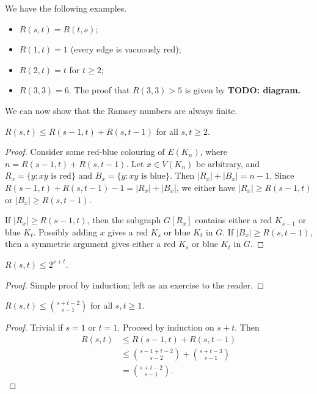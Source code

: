 \documentclass[main.tex]{subfiles}
\begin{document}
We have the following examples.
\begin{example*}
  \listhack
  \begin{itemize}
    \item $R(s,t) = R(t,s)$;
    \item $R(1,t) = 1$ (every edge is vacuously red);
    \item $R(2,t) = t$ for $t\geq 2$;
    \item $R(3,3) = 6$. The proof that $R(3,3) > 5$ is given by
      \textbf{TODO: diagram.}
  \end{itemize}
\end{example*}
We can now show that the Ramsey numbers are always finite.
\begin{proposition}
  $R(s,t)\leq R(s-1,t) + R(s,t-1)$ for all $s,t\geq 2$.
\end{proposition}
\begin{proof}
  Consider some red-blue colouring of $E(K_n)$, where $n = R(s-1,t) + R(s,t-1)$.
  Let $x\in V(K_n)$ be arbitrary, and $R_x = \{y : xy\text{ is red}\}$ and
  $B_x = \{y : xy\text{ is blue}\}$.
  Then $|R_x| + |B_x| = n - 1$.
  Since $R(s-1,t) + R(s,t-1) - 1 = |R_x| + |B_x|$,
  we either have $|R_x|\geq R(s-1,t)$ or $|B_x|\geq R(s,t-1)$.

  If $|R_x|\geq R(s-1,t)$, then the subgraph $G[R_x]$ contains either a red
  $K_{s-1}$ or blue $K_t$.
  Possibly adding $x$ gives a red $K_s$ or blue $K_t$ in $G$.
  If $|B_x|\geq R(s,t-1)$, then a symmetric argument gives either a red $K_s$
  or blue $K_t$ in $G$.
\end{proof}
\begin{corollary}
  $R(s,t)\leq 2^{s+t}$.
\end{corollary}
\begin{proof}
  Simple proof by induction; left as an exercise to the reader.
\end{proof}
\begin{theorem}
  $R(s,t)\leq\binom{s+t-2}{s-1}$ for all $s,t\geq 1$.
\end{theorem}
\begin{proof}
  Trivial if $s = 1$ or $t = 1$.
  Proceed by induction on $s+t$.
  Then
  \begin{align*}
    R(s,t)&\leq R(s-1,t) + R(s,t-1) \\
          &\leq\binom{s-1+t-2}{s-2} + \binom{s+t-3}{s-1}\tag{inductive hypothesis} \\
          &= \binom{s+t-2}{s-1}. \tag*{\qedhere}
  \end{align*}
\end{proof}
\end{document}
